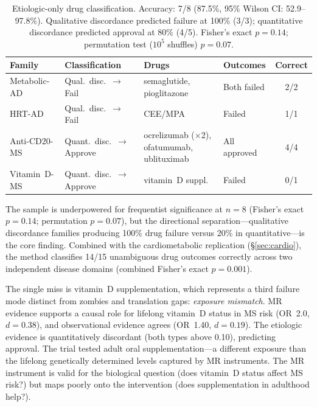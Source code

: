 \documentclass[11pt]{article}
\begin{document}
\begin{table}[t]
\centering
\caption{Etiologic-only drug classification. Accuracy: 7/8 (87.5\%, 95\% Wilson CI: 52.9--97.8\%). Qualitative discordance predicted failure at 100\% (3/3); quantitative discordance predicted approval at 80\% (4/5). Fisher's exact $p = 0.14$; permutation test ($10^5$ shuffles) $p = 0.07$.}
\label{tab:drugs_stage1}
\begin{tabular}{llllc}
\toprule
Family & Classification & Drugs & Outcomes & Correct \\
\midrule
Metabolic-AD & Qual.\ disc.\ $\to$ Fail & semaglutide, pioglitazone & Both failed & 2/2 \\
HRT-AD & Qual.\ disc.\ $\to$ Fail & CEE/MPA & Failed & 1/1 \\
Anti-CD20-MS & Quant.\ disc.\ $\to$ Approve & \parbox[t]{3.2cm}{ocrelizumab ($\times$2),\\ofatumumab,\\ublituximab} & All approved & 4/4 \\
Vitamin~D-MS & Quant.\ disc.\ $\to$ Approve & vitamin~D suppl. & Failed & 0/1 \\
\bottomrule
\end{tabular}
\end{table}

The sample is underpowered for frequentist significance at $n = 8$ (Fisher's exact $p = 0.14$; permutation $p = 0.07$), but the directional separation---qualitative discordance families producing 100\% drug failure versus 20\% in quantitative---is the core finding. Combined with the cardiometabolic replication (\S\ref{sec:cardio}), the method classifies 14/15 unambiguous drug outcomes correctly across two independent disease domains (combined Fisher's exact $p = 0.001$).

The single miss is vitamin~D supplementation, which represents a third failure mode distinct from zombies and translation gaps: \emph{exposure mismatch}. MR evidence supports a causal role for lifelong vitamin~D status in MS risk (OR~2.0, $d = 0.38$), and observational evidence agrees (OR~1.40, $d = 0.19$). The etiologic evidence is quantitatively discordant (both types above 0.10), predicting approval. The trial tested adult oral supplementation---a different exposure than the lifelong genetically determined levels captured by MR instruments. The MR instrument is valid for the biological question (does vitamin~D status affect MS risk?) but maps poorly onto the intervention (does supplementation in adulthood help?).
\end{document}
